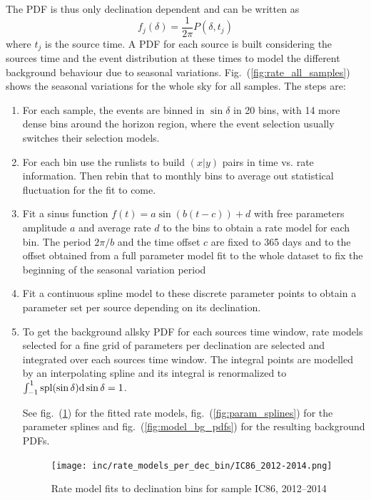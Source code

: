 The PDF is thus only declination dependent and can be written as
\begin{equation}
  f_j(\delta) = \frac{1}{2\pi}P(\delta, t_j)
\end{equation}
where $t_j$ is the source time.
A PDF for each source is built considering the sources time and the event distribution at these times to model the different background behaviour due to seasonal variations.
Fig.~(\ref{fig:rate_all_samples}) shows the seasonal variations for the whole sky for all samples.
The steps are:
\begin{enumerate}
  \item For each sample, the events are binned in $\sin\delta$ in 20 bins, with 14 more dense bins around the horizon region, where the event selection usually switches their selection models.
  \item For each bin use the runlists to build $(x|y)$ pairs in time vs. rate information.
  Then rebin that to monthly bins to average out statistical fluctuation for the fit to come.
  \item Fit a sinus function $f(t) = a \sin(b(t-c)) + d$ with free parameters amplitude $a$ and average rate $d$ to the bins to obtain a rate model for each bin.
  The period $2\pi/b$ and the time offset $c$ are fixed to 365 days and to the offset obtained from a full parameter model fit to the whole dataset to fix the beginning of the seasonal variation period
  \item Fit a continuous spline model to these discrete parameter points to obtain a parameter set per source depending on its declination.
  \item To get the background allsky PDF for each sources time window, rate models selected for a fine grid of parameters per declination are selected and integrated over each sources time window.
  The integral points are modelled by an interpolating spline and its integral is renormalized to $\int_{-1}^{1} \mathrm{spl}(\sin\delta) \mathrm{d}\sin\delta = 1$.

See fig.~(\ref{fig:dec_bin_rate_models}) for the fitted rate models, fig.~(\ref{fig:param_splines}) for the parameter splines and fig.~(\ref{fig:model_bg_pdfs}) for the resulting background PDFs.

\begin{figure}[h]
  \centering
  \texttt{[image: inc/rate\_models\_per\_dec\_bin/IC86\_2012-2014.png]}
  \caption{Rate model fits to declination bins for sample IC86, 2012–2014}
  \label{fig:dec_bin_rate_models}
\end{figure}


\end{enumerate}
